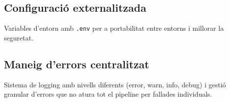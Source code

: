 \subsection{Configuració externalitzada}
Variables d'entorn amb \texttt{.env} per a portabilitat entre entorns i millorar la seguretat.

\subsection{Maneig d'errors centralitzat}
Sistema de logging amb nivells diferents (error, warn, info, debug) i gestió granular d'errors que no atura tot el pipeline per fallades individuals.

